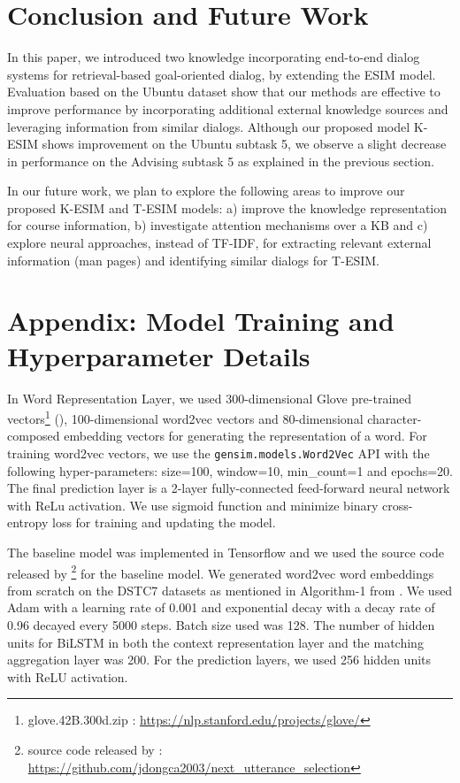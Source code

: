 \documentclass[letterpaper]{article} %
\begin{document}
\section{Conclusion and Future Work}
In this paper, we introduced two knowledge incorporating end-to-end dialog systems for retrieval-based goal-oriented dialog, by extending the ESIM model. Evaluation based on the Ubuntu dataset show that our methods are effective to improve performance by incorporating additional external knowledge sources and leveraging information from similar dialogs. Although our proposed model K-ESIM shows improvement on the Ubuntu subtask 5, we observe a slight decrease in performance on the Advising subtask 5 as explained in the previous section.

In our future work, we plan to explore the following areas to improve our proposed K-ESIM and T-ESIM models: a) improve the knowledge representation for course information, b) investigate attention mechanisms over a KB \cite{eric2017key} and c) explore neural approaches, instead of TF-IDF, for extracting relevant external information (man pages) and identifying similar dialogs for T-ESIM.

\section{Appendix: Model Training and Hyperparameter Details}
In Word Representation Layer, we used 300-dimensional Glove pre-trained vectors\footnote{glove.42B.300d.zip : \url{https://nlp.stanford.edu/projects/glove/}} (\cite{pennington2014glove}), 100-dimensional word2vec vectors \cite{mikolov2013efficient} and 80-dimensional character-composed embedding vectors for generating the representation of a word. For training word2vec vectors, we use the \texttt{gensim.models.Word2Vec} API with the following hyper-parameters: size=100, window=10, min\_count=1 and epochs=20. The final prediction layer is a 2-layer fully-connected feed-forward neural network with ReLu activation. We use sigmoid function and minimize binary cross-entropy loss for training and updating the model.

The baseline model was implemented in Tensorflow \cite{abadi2016tensorflow} and we used the source code released by \citeauthor{dong2018enhance} \footnote{source code released by \citeauthor{dong2018enhance} : \url{https://github.com/jdongca2003/next_utterance_selection}} for the baseline model. We generated word2vec word embeddings from scratch on the DSTC7 datasets as mentioned in Algorithm-1 from \citeauthor{dong2018enhance} . We used Adam \cite{kingma2014adam} with a learning rate of 0.001 and exponential decay with a decay rate of 0.96 decayed every 5000 steps. Batch size used was 128. The number of hidden units for BiLSTM in both the context representation layer and the matching aggregation layer was 200. For the prediction layers, we used 256 hidden units with ReLU activation.
\end{document}
